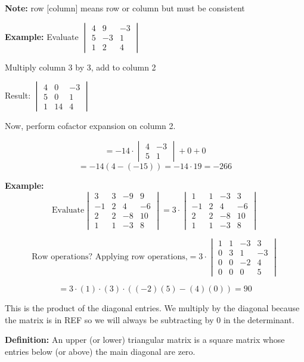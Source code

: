 \documentclass{article}
\begin{document}
\textbf{Note:} row [column] means row or column but must be consistent

\textbf{Example:} Evaluate \( \begin{vmatrix} 4 & 9 & -3 \\ 5 & -3 & 1 \\ 1 & 2 & 4 \end{vmatrix} \) 

Multiply column 3 by 3, add to column 2

Result: \( \begin{vmatrix} 4 & 0 & -3 \\ 5 & 0 & 1 \\ 1 & 14 & 4 \end{vmatrix} \)

Now, perform cofactor expansion on column 2.

\[
= -14 \cdot \begin{vmatrix} 4 & -3 \\ 5 & 1 \end{vmatrix} + 0 + 0
\]
\[
= -14(4 - (-15)) = -14 \cdot 19 = -266
\]


\textbf{Example:} \[
\text{Evaluate} \begin{vmatrix}
3 & 3 & -9 & 9 \\
-1 & 2 & 4 & -6 \\
2 & 2 & -8 & 10 \\
1 & 1 & -3 & 8
\end{vmatrix} = 3 \cdot \begin{vmatrix}
1 & 1 & -3 & 3 \\
-1 & 2 & 4 & -6 \\
2 & 2 & -8 & 10 \\
1 & 1 & -3 & 8
\end{vmatrix}
\]

\[
\text{Row operations? Applying row operations,} = 3 \cdot \begin{vmatrix}
1 & 1 & -3 & 3 \\
0 & 3 & 1 & -3 \\
0 & 0 & -2 & 4 \\
0 & 0 & 0 & 5
\end{vmatrix}
\]

\[= 3 \cdot (1) \cdot (3) \cdot ((-2)(5) - (4)(0)) = 90\]

This is the product of the diagonal entries. We multiply by the diagonal because the matrix is in REF so we will always be subtracting by 0 in the determinant.

\textbf{Definition:} An upper (or lower) triangular matrix is a square matrix whose entries below (or above) the main diagonal are zero. 
\end{document}
